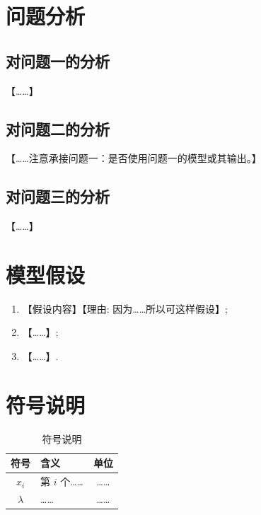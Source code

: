 \documentclass[11pt]{ctexart}
\begin{document}
\section{问题分析}
\subsection{对问题一的分析}
【……】
\subsection{对问题二的分析}
【……注意承接问题一：是否使用问题一的模型或其输出。】
\subsection{对问题三的分析}
【……】

\section{模型假设}
\begin{enumerate}
  \item 【假设内容】【理由: 因为……所以可这样假设】;
  \item 【……】;
  \item 【……】.
\end{enumerate}

\section{符号说明}
\begin{table}[H]
  \centering
  \begin{tabular}{clc}
    \toprule
    符号 & 含义 & 单位 \\
    \midrule
    $x_i$ & 第 $i$ 个…… & …… \\
    $\lambda$ & …… & …… \\
    \bottomrule
  \end{tabular}
  \caption{符号说明}
\end{table}

\end{document}
